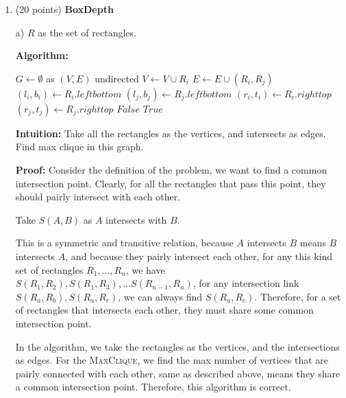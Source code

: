 \documentclass{article}
\newcommand{\Algorithm}{\textbf{Algorithm: }}
\newcommand{\Intuition}{\textbf{Intuition: }}
\newcommand{\Proof}{\textbf{Proof: }}
\newcounter{problem}
\begin{document}
\begin{enumerate}[topsep=0pt,parsep=1mm]

\item (20 points) \textbf{BoxDepth} 

a) $R$ as the set of rectangles.

\Algorithm

\begin{algorithm}[H]
    \DontPrintSemicolon
    
     {
        $G\gets\emptyset$ as $(V,E)$ undirected\;
         {
            $V\gets V\cup R_i$\;
        }
         {
             {
                 {
                    $E\gets E\cup (R_i,R_j)$\;
                }
            }
        }
        \Return {}
    }
     {
      $(l_i,b_i)\gets R_i.leftbottom$\;
      $(l_j,b_j)\gets R_j.leftbottom$\;
      $(r_i,t_i)\gets R_i.righttop$\;
      $(r_j,t_j)\gets R_j.righttop$\;
       {
        \Return $False$
      }
      \Return $True$
    } 
\end{algorithm}

\Intuition
Take all the rectangles as the vertices, 
and intersects as edges.
Find max clique in this graph.

\Proof
Consider the definition of the problem, we want to find a common intersection point.
Clearly, for all the rectangles that pass this point,
they should pairly intersect with each other.

Take $S(A,B)$ as $A$ intersects with $B$.

This is a symmetric and transitive relation, 
because $A$ intersects $B$ means $B$ intersects $A$,
and because they pairly intersect each other,
for any this kind set of rectangles ${R_1,...,R_n}$,
we have $S(R_1,R_2),S(R_1,R_3),...S(R_{n-1},R_n)$, 
for any intersection link $S(R_a,R_b),S(R_a,R_c)$, we can always find $S(R_a,R_c)$.
Therefore, for a set of rectangles that intersects each other,
they must share some common intersection point.

In the algorithm, we take the rectangles as the vertices,
and the intersections as edges.
For the \textsc{MaxClique}, 
we find the max number of vertices that are pairly connected with each other,
same as described above, means they share a common intersection point.
Therefore, this algorithm is correct.


\end{enumerate}
\end{document}
